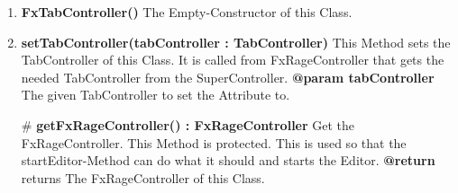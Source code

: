 \documentclass{article}
\begin{document}
				\begin{enumerate}[+]
					\item{
						\textbf{FxTabController()} \newline
						The Empty-Constructor of this Class.
						\newline
					}
					\item{
						\textbf{setTabController(tabController : TabController)} \newline
						This Method sets the TabController of this Class.
						It is called from FxRageController that gets the needed TabController from the SuperController.
						\newline
						\textbf{@param tabController}
							The given TabController to set the Attribute to.
							\newline
					}
					\item[\#]{
						\textbf{getFxRageController() : FxRageController} \newline
						Get the FxRageController.
						This Method is protected.
						This is used so that the startEditor-Method can do what it should and starts the Editor.
						\newline
						\textbf{@return} returns
						The FxRageController of this Class.
						\newline
					}
				\end{enumerate}
			
\end{document}
